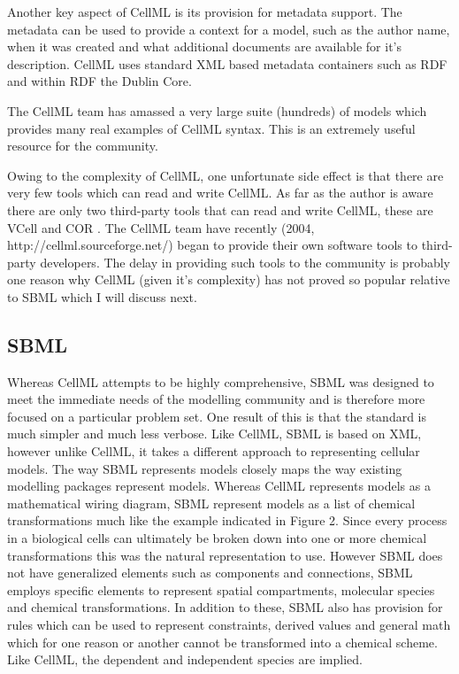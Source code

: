 \documentclass[12pt]{article}
\begin{document}
Another key aspect of CellML is its provision for metadata
support. The metadata can be used to provide a context for a
model, such as the author name, when it was created and what
additional documents are available for it's description. CellML
uses standard XML based metadata containers such as RDF and within
RDF the Dublin Core.

The CellML team has amassed a very large suite (hundreds) of
models which provides many real examples of CellML syntax. This is
an extremely useful resource for the community.

Owing to the complexity of CellML, one unfortunate side effect
is that there are very few tools which can read and write CellML.
As far as the author is aware there are only two third-party tools
that can read and write CellML, these are VCell \cite{VCELL} and COR \cite{COR2003}. The
CellML team have recently (2004, http://cellml.sourceforge.net/)
began to provide their own software tools to third-party
developers. The delay in providing such tools to the community is
probably one reason why CellML (given it's complexity) has not
proved so popular relative to SBML which I will discuss next.


%
%

\subsection{SBML}

Whereas CellML attempts to be highly comprehensive, SBML was
designed to meet the immediate needs of the modelling community and
is therefore more focused on a particular problem set. One result of
this is that the standard is much simpler and much less verbose.
Like CellML, SBML is based on XML, however unlike CellML, it takes
a different approach to representing cellular models. The way
SBML represents models closely maps the way existing modelling
packages represent models. Whereas CellML represents models as a
mathematical wiring diagram, SBML represent models as a list of
chemical transformations much like the example indicated in Figure 2. Since every process in a biological cells can ultimately be broken down into one or more chemical
transformations this was the natural representation to use.
However SBML does not have generalized elements such as
components and connections, SBML employs specific elements to
represent spatial compartments, molecular species and chemical
transformations. In addition to these, SBML also has provision for
rules which can be used to represent constraints, derived values
and general math which for one reason or another cannot be
transformed into a chemical scheme. Like CellML, the dependent and
independent species are implied.
\end{document}
